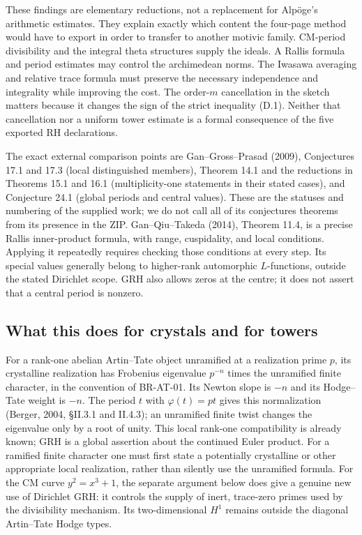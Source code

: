 \documentclass[11pt,a4paper]{article}
\theoremstyle{definition}\newtheorem{definition}[theorem]{Definition}
\theoremstyle{remark}\newtheorem{remark}[theorem]{Remark}
\begin{document}
These findings are elementary reductions, not a replacement for
Alp\"oge's arithmetic estimates.  They explain exactly which
content the four-page method would have to export in order to
transfer to another motivic family.  CM-period divisibility and
the integral theta structures supply the ideals.  A Rallis
formula and period estimates may control the archimedean norms.
The Iwasawa averaging and relative trace formula must preserve
the necessary independence and integrality while improving the
cost.  The order-$m$ cancellation in the sketch matters because
it changes the sign of the strict inequality (D.1).  Neither
that cancellation nor a uniform tower estimate is a formal
consequence of the five exported RH declarations.

The exact external comparison points are Gan--Gross--Prasad
(2009), Conjectures 17.1 and 17.3 (local distinguished members),
Theorem 14.1 and the reductions in Theorems 15.1 and 16.1
(multiplicity-one statements in their stated cases), and
Conjecture 24.1 (global periods and central values).  These are
the statuses and numbering of the supplied work; we do not call
all of its conjectures theorems from its presence in the ZIP.
Gan--Qiu--Takeda (2014), Theorem 11.4, is a precise Rallis
inner-product formula, with range, cuspidality, and local
conditions.  Applying it repeatedly requires checking those
conditions at every step.  Its special values generally belong
to higher-rank automorphic $L$-functions, outside the stated
Dirichlet scope.  GRH also allows zeros at the centre; it does
not assert that a central period is nonzero.

\subsection{What this does for crystals and for towers}

For a rank-one abelian Artin--Tate object unramified at a
realization prime $p$, its crystalline realization has Frobenius
eigenvalue $p^{-n}$ times the unramified finite character, in the
convention of BR-AT-01.  Its Newton slope is $-n$ and its
Hodge--Tate weight is $-n$.  The period $t$ with $\varphi(t)=pt$ gives this normalization
(Berger, 2004, \S II.3.1 and II.4.3); an unramified finite twist
changes the eigenvalue only by a root of unity.  This local rank-one
compatibility is already known; GRH is a global assertion about the continued
Euler product.  For a ramified finite character one must first
state a potentially crystalline or other appropriate local
realization, rather than silently use the unramified formula.
For the CM curve $y^2=x^3+1$, the separate argument below does
give a genuine new use of Dirichlet GRH: it controls the supply
of inert, trace-zero primes used by the divisibility mechanism.
Its two-dimensional $H^1$ remains outside the diagonal
Artin--Tate Hodge types.
\end{document}
